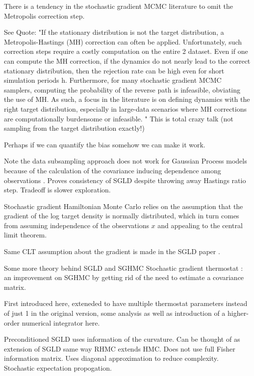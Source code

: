 \documentclass{book}
\begin{document}
\begin{enumerate}
There is a tendency in the stochastic gradient MCMC literature to omit the Metropolis correction step.

See \cite{ding2014bayesian} 
Quote: "If the stationary distribution is not the target distribution, a Metropolis-Hastings (MH) correction can often be applied. Unfortunately, such correction steps require a costly computation on the entire
2
dataset. Even if one can compute the MH correction, if the dynamics do not nearly lead to the correct stationary distribution, then the rejection rate can be high even for short simulation periods h. Furthermore, for many stochastic gradient MCMC samplers, computing the probability of the reverse path is infeasible, obviating the use of MH. As such, a focus in the literature is on defining dynamics with the right target distribution, especially in large-data scenarios where MH corrections are computationally burdensome or infeasible.
"
\cite{ma2015complete}
This is total crazy talk (not sampling from the target distribution exactly!)

Perhaps if we can quantify the bias somehow we can make it work.

Note the data subsampling approach does not work for Gaussian Process models because of the calculation of the covariance inducing dependence among observations \cite{filippone2015enabling}.
\cite{teh2014consistency}
Proves consistency of SGLD despite throwing away Hastings ratio step. Tradeoff is slower exploration.

Stochastic gradient Hamiltonian Monte Carlo \cite{chen2014stochastic}
relies on the assumption that the gradient of the log target density is normally distributed, which in turn comes from assuming independence of the observations $x$ and appealing to the central limit theorem.

Same CLT assumption about the gradient is made in
the SGLD paper \cite{welling2011bayesian}.

Some more theory behind SGLD and SGHMC \cite{ma2015complete}
Stochastic gradient thermostat : an improvement on SGHMC by getting rid of the need to estimate a covariance matrix. 

First introduced here\cite{ding2014bayesian}, exteneded\cite{gan2015scalable} to have multiple thermostat parameters instead of just 1 in the original version, some analysis as well as introduction of a higher-order numerical integrator here\cite{li2015high,chen2015convergence}.

Preconditioned SGLD \cite{li2015preconditioned} uses information of the curvature. Can be thought of as extension of SGLD same way RHMC extends HMC. Does not use full Fisher information matrix. Uses diagonal approximation to reduce complexity.
Stochastic expectation propogation.


\end{enumerate}
\end{document}
